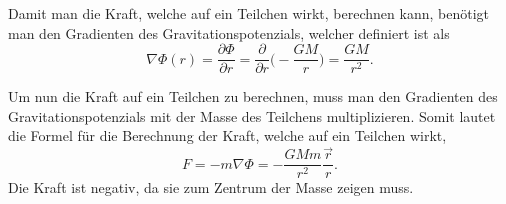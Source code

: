 Damit man die Kraft, welche auf ein Teilchen wirkt, berechnen kann, benötigt man den Gradienten des Gravitationspotenzials, welcher definiert ist als
\begin{equation*}
	\nabla \Phi (r) = \frac{\partial \Phi}{\partial r} = \frac{\partial}{\partial r} \biggl( -\frac{GM}{r} \biggr) = \frac{GM}{r^2}.
\end{equation*}

Um nun die Kraft auf ein Teilchen zu berechnen, muss man den Gradienten des Gravitationspotenzials mit der Masse des Teilchens multiplizieren.
Somit lautet die Formel für die Berechnung der Kraft, welche auf ein Teilchen wirkt,
\begin{equation*}
	F = -m\nabla \Phi = -\frac{GMm}{r^2} \frac{\vec{r}}{r}.
\end{equation*}
Die Kraft ist negativ, da sie zum Zentrum der Masse zeigen muss.


